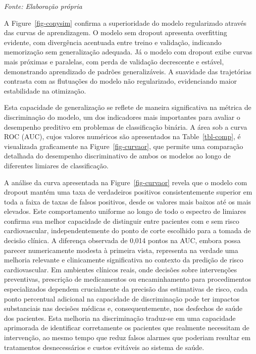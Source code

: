 \documentclass[
  oneclumn]{article}
\begin{document}
\begin{minipage}{\textwidth}
\centering
\vspace{-10pt}
\footnotesize \textit{Fonte: Elaboração própria}
\end{minipage}

A Figure~\ref{fig-conysim} confirma a superioridade do modelo
regularizado através das curvas de aprendizagem. O modelo sem dropout
apresenta overfitting evidente, com divergência acentuada entre treino e
validação, indicando memorização sem generalização adequada. Já o modelo
com dropout exibe curvas mais próximas e paralelas, com perda de
validação decrescente e estável, demonstrando aprendizado de padrões
generalizáveis. A suavidade das trajetórias contrasta com as flutuações
do modelo não regularizado, evidenciando maior estabilidade na
otimização.

Esta capacidade de generalização se reflete de maneira significativa na
métrica de discriminação do modelo, um dos indicadores mais importantes
para avaliar o desempenho preditivo em problemas de classificação
binária. A área sob a curva ROC (AUC), cujos valores numéricos são
apresentados na Table~\ref{tbl-comp}, é visualizada graficamente na
Figure~\ref{fig-curvaor}, que permite uma comparação detalhada do
desempenho discriminativo de ambos os modelos ao longo de diferentes
limiares de classificação.

A análise da curva apresentada na Figure~\ref{fig-curvaor} revela que o
modelo com dropout mantém uma taxa de verdadeiros positivos
consistentemente superior em toda a faixa de taxas de falsos positivos,
desde os valores mais baixos até os mais elevados. Este comportamento
uniforme ao longo de todo o espectro de limiares confirma sua melhor
capacidade de distinguir entre pacientes com e sem risco cardiovascular,
independentemente do ponto de corte escolhido para a tomada de decisão
clínica. A diferença observada de 0,014 pontos na AUC, embora possa
parecer numericamente modesta à primeira vista, representa na verdade
uma melhoria relevante e clinicamente significativa no contexto da
predição de risco cardiovascular. Em ambientes clínicos reais, onde
decisões sobre intervenções preventivas, prescrição de medicamentos ou
encaminhamento para procedimentos especializados dependem crucialmente
da precisão das estimativas de risco, cada ponto percentual adicional na
capacidade de discriminação pode ter impactos substanciais nas decisões
médicas e, consequentemente, nos desfechos de saúde dos pacientes. Esta
melhoria na discriminação traduz-se em uma capacidade aprimorada de
identificar corretamente os pacientes que realmente necessitam de
intervenção, ao mesmo tempo que reduz falsos alarmes que poderiam
resultar em tratamentos desnecessários e custos evitáveis ao sistema de
saúde.
\end{document}
